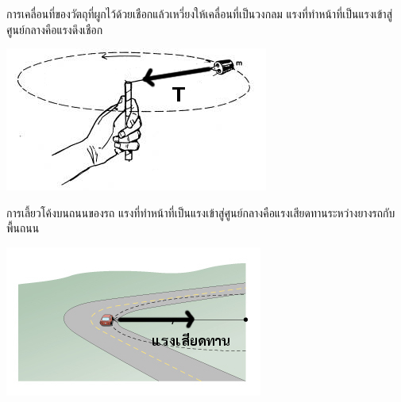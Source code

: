 \begin{center}
\begin{minipage}{.6\textwidth}
การเคลื่อนที่ของวัตถุที่ผูกไว้ด้วยเชือกแล้วเหวี่ยงให้เคลื่อนที่เป็นวงกลม       แรงที่ทำหน้าที่เป็นแรงเข้าสู่ศูนย์กลางคือแรงดึงเชือก
\end{minipage} \hfill
\begin{adjustbox}{valign=c} 
    \begin{minipage}[t]{.35\linewidth}
        \includegraphics[width=\linewidth]{content-12-1.jpg}
    \end{minipage}
\end{adjustbox}
\end{center}

\begin{center}
\begin{minipage}{.6\textwidth}
การเลี้ยวโค้งบนถนนของรถ	แรงที่ทำหน้าที่เป็นแรงเข้าสู่ศูนย์กลางคือแรงเสียดทานระหว่างยางรถกับพื้นถนน
\end{minipage} \hfill
\begin{adjustbox}{valign=c} 
    \begin{minipage}[t]{.35\linewidth}
        \includegraphics[width=\linewidth]{content-12-4.jpg}
    \end{minipage}
\end{adjustbox}
\end{center}

